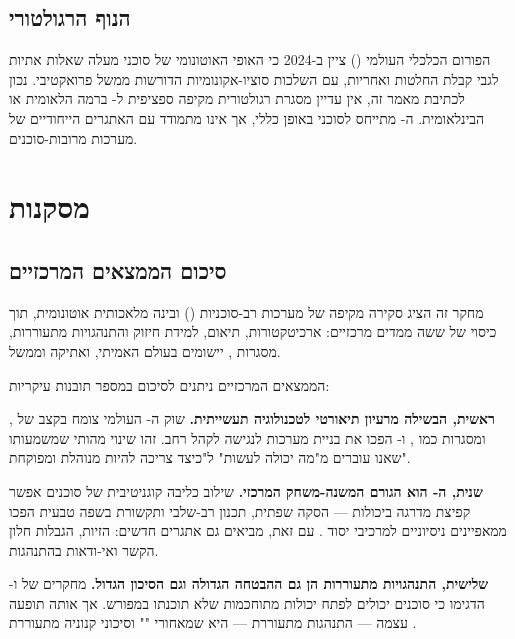 \documentclass[12pt,a4paper]{article}
\begin{document}
\subsection{הנוף הרגולטורי}

הפורום הכלכלי העולמי () ציין ב-2024 \cite{WEF2024} כי האופי האוטונומי של סוכני  מעלה שאלות אתיות לגבי קבלת החלטות ואחריות, עם השלכות סוציו-אקונומיות הדורשות ממשל פרואקטיבי. נכון לכתיבת מאמר זה, אין עדיין מסגרת רגולטורית מקיפה ספציפית ל- ברמה הלאומית או הבינלאומית. ה- מתייחס לסוכני  באופן כללי, אך אינו מתמודד עם האתגרים הייחודיים של מערכות מרובות-סוכנים.

\newpage

\section{מסקנות}

\subsection{סיכום הממצאים המרכזיים}

מחקר זה הציג סקירה מקיפה של מערכות רב-סוכניות () ובינה מלאכותית אוטונומית, תוך כיסוי של ששה ממדים מרכזיים: ארכיטקטורות, תיאום, למידת חיזוק והתנהגויות מתעוררות, מסגרות , יישומים בעולם האמיתי, ואתיקה וממשל.

הממצאים המרכזיים ניתנים לסיכום במספר תובנות עיקריות:

\textbf{ראשית,  הבשילה מרעיון תיאורטי לטכנולוגיה תעשייתית.} שוק ה- העולמי צומח בקצב של  \cite{MarketUS2024}, ומסגרות כמו ,  ו- הפכו את בניית מערכות  לנגישה לקהל רחב. זהו שינוי מהותי שמשמעותו שאנו עוברים מ"מה  יכולה לעשות" ל"כיצד  צריכה להיות מנוהלת ומפוקחת".

\textbf{שנית, ה- הוא הגורם המשנה-משחק המרכזי.} שילוב  כליבה קוגניטיבית של סוכנים אפשר קפיצת מדרגה ביכולות --- הסקה שפתית, תכנון רב-שלבי ותקשורת בשפה טבעית הפכו ממאפיינים ניסיוניים למרכיבי יסוד \cite{arXiv2402}. עם זאת,  מביאים גם אתגרים חדשים: הזיות, הגבלות חלון הקשר ואי-ודאות בהתנהגות.

\textbf{שלישית, התנהגויות מתעוררות הן גם ההבטחה הגדולה וגם הסיכון הגדול.} מחקרים של  \cite{GoogleResearch_SocialLearning2021} ו- \cite{DeepMind_Bartering} הדגימו כי סוכנים יכולים לפתח יכולות מתוחכמות שלא תוכנתו במפורש. אך אותה תופעה עצמה --- התנהגות מתעוררת --- היא שמאחורי "" \cite{MIT_Media2025} וסיכוני קנוניה מתעוררת \cite{CoopAI2024}.
\end{document}
